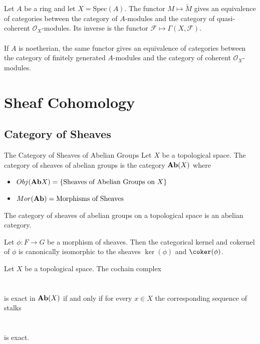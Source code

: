 \documentclass[a4paper]{article}
\begin{document}
\begin{prp}{}{} Let $A$ be a ring and let $X=\text{Spec}(A)$. The functor $M\mapsto\tilde{M}$ gives an equivalence of categories between the category of $A$-modules and the category of quasi-coherent $\mathcal{O}_X$-modules. Its inverse is the functor $\mathcal{F}\mapsto\Gamma(X,\mathcal{F})$. \\~\\
If $A$ is noetherian, the same functor gives an equivalence of categories between the category of finitely generated $A$-modules and the category of coherent $\mathcal{O}_X$-modules. 
\end{prp}

\pagebreak
\section{Sheaf Cohomology}
\subsection{Category of Sheaves}
\begin{defn}{The Category of Sheaves of Abelian Groups}{} Let $X$ be a topological space. The category of sheaves of abelian groups is the category $\bold{Ab}(X)$ where
\begin{itemize}
\item $Obj(\bold{Ab}X)=\{\text{Sheaves of Abelian Groups on }X\}$
\item $Mor(\bold{Ab})=\text{Morphisms of Sheaves}$
\end{itemize}
\end{defn}

\begin{prp}{}{} The category of sheaves of abelian groups on a topological space is an abelian category. 
\end{prp}

\begin{prp}{}{} Let $\phi:F\to G$ be a morphism of sheaves. Then the categorical kernel and cokernel of $\phi$ is canonically isomorphic to the sheaves $\ker(\phi)$ and $\coker(\phi)$. 
\end{prp}

\begin{prp}{}{} Let $X$ be a topological space. The cochain complex \\
 \\~\\
is exact in $\bold{Ab}(X)$ if and only if for every $x\in X$ the corresponding sequence of stalks \\
 \\~\\
is exact. 
\end{prp}
\end{document}
